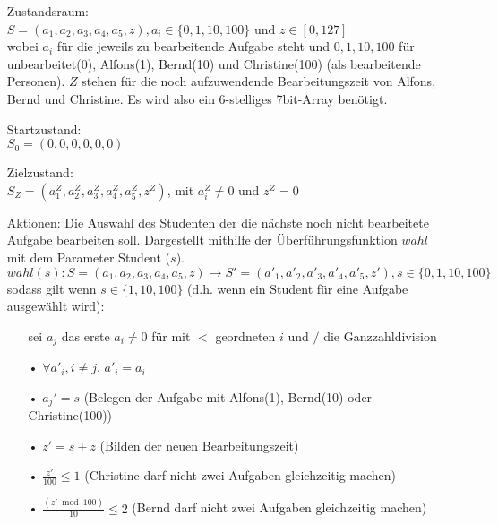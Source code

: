 \documentclass[a4paper]{article}
\begin{document}
	\begin{itemize}
    	\item[] Zustandsraum: \\
    	$S = (a_1, a_2, a_3, a_4, a_5, z), a_i \in \{0, 1, 10, 100\}$ und $z \in [0,127]$ \\
    	wobei $a_i$ für die jeweils zu bearbeitende Aufgabe steht und $0,1, 10, 100$ für unbearbeitet(0), Alfons(1), Bernd(10) und Christine(100) (als bearbeitende Personen). $Z$ stehen für die noch aufzuwendende Bearbeitungszeit von Alfons, Bernd und Christine. Es wird also ein 6-stelliges 7bit-Array benötigt.
    	
    	\item[] Startzustand:\\
    	$S_0 = (0,0,0,0,0,0)$
    	
    	\item[] Zielzustand:\\
    	$S_Z = (a^{Z}_1,a^{Z}_2,a^{Z}_3,a^{Z}_4,a^{Z}_5,z^Z)$, mit $a^{Z}_i \neq 0$ und $z^Z=0$
    	
    	\item[] Aktionen: Die Auswahl des Studenten der die nächste noch nicht bearbeitete Aufgabe bearbeiten soll. Dargestellt mithilfe der Überführungsfunktion $wahl$ mit dem Parameter Student ($s$).\\
    	$wahl(s):S = (a_1, a_2, a_3, a_4, a_5, z)\rightarrow S' = (a'_1, a'_2, a'_3, a'_4, a'_5, z'), s \in \{0,1,10,100\}$\\
    	sodass gilt wenn $s \in \{1,10,100\}$ (d.h. wenn ein Student für eine Aufgabe ausgewählt wird):
    	\begin{itemize}%
    	\item[] sei $a_j$ das erste $a_i \neq 0$ für mit $<$ geordneten $i$ und $/$ die Ganzzahldivision
    	
		\item[•] $\forall a'_i, i \neq j$. $a'_i=a_i$   	
    	
    	\item[•] $a_j' = s$ \qquad (Belegen der Aufgabe mit Alfons(1), Bernd(10) oder Christine(100))
    	
    	\item[•] $z' = s+z$ \qquad (Bilden der neuen Bearbeitungszeit)
    	  	
    	\item[•] $\frac{z'}{100} \leq 1$ \qquad (Christine darf nicht zwei Aufgaben gleichzeitig machen)
    	
    	\item[•] $\frac{(z' \bmod 100)}{10} \leq 2$ \qquad (Bernd darf nicht zwei Aufgaben gleichzeitig machen)
    	

\end{itemize}
\end{itemize}
\end{document}
